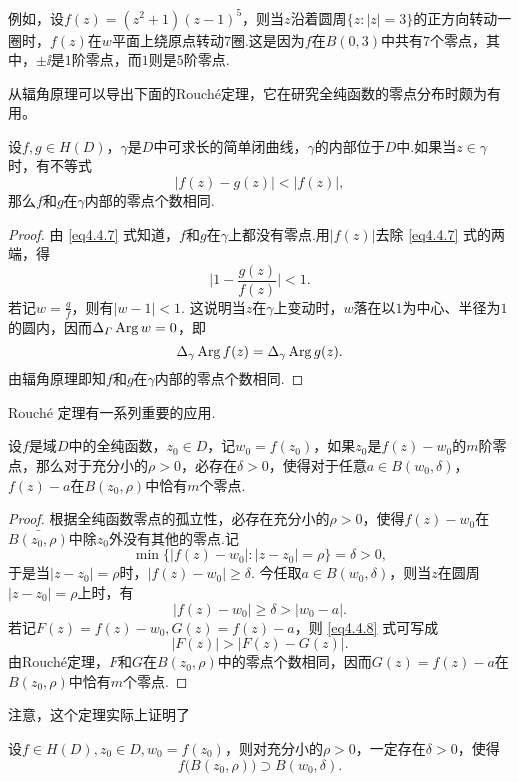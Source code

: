例如，设$f(z)=(z^2+1)(z-1)^5$，则当$z$沿着圆周$\{z:|z|=3\}$的正方向转动一圈时，$f(z)$在$w$平面上绕原点转动$7$圈.这是因为$f$在$B(0,3)$中共有$7$个零点，其中，$\pm\ii$是$1$阶零点，而$1$则是$5$阶零点.

从辐角原理可以导出下面的Rouch\'e定理，它在研究全纯函数的零点分布时颇为有用。
\begin{theorem}\label{thm4.4.3}
设$f,g\in H(D)$，$\gamma$是$D$中可求长的简单闭曲线，$\gamma$的内部位于$D$中.如果当$z\in\gamma$时，有不等式
\begin{equation}\label{eq4.4.7}
|f(z)-g(z)|<|f(z)|,
\end{equation}
那么$f$和$g$在$\gamma$内部的零点个数相同.
\end{theorem}
\begin{proof}
由 \eqref{eq4.4.7} 式知道，$f$和$g$在$\gamma$上都没有零点.用$|f(z)|$去除 \eqref{eq4.4.7} 式的两端，得
\[\bigg|1-\frac{g(z)}{f(z)}\bigg|<1.\]
若记$w=\frac gf$，则有$|w-1|<1$. 这说明当$z$在$\gamma$上变动时，$w$落在以$1$为中心、半径为$1$的圆内，因而$\Delta_\varGamma\operatorname{Arg} w=0$，即
\[\Delta_\gamma\operatorname{Arg} f(z)=\Delta_\gamma\operatorname{Arg} g(z).\]
由辐角原理即知$f$和$g$在$\gamma$内部的零点个数相同.
\end{proof}

Rouch\'e 定理有一系列重要的应用.
\begin{theorem}\label{thm4.4.4}
设$f$是域$D$中的全纯函数，$z_0\in D$，记$w_0=f(z_0)$，如果$z_0$是$f(z)-w_0$的$m$阶零点，那么对于充分小的$\rho>0$，必存在$\delta>0$，使得对于任意$a\in B(w_0,\delta)$，$f(z)-a$在$B(z_0,\rho)$中恰有$m$个零点.
\end{theorem}
\begin{proof}
根据全纯函数零点的孤立性，必存在充分小的$\rho>0$，使得$f(z)-w_0$在$\bar{B(z_0,\rho)}$中除$z_0$外没有其他的零点.记
\[\min\{|f(z)-w_0|:|z-z_0|=\rho\}=\delta>0,\]
于是当$|z-z_0|=\rho$时，$|f(z)-w_0|\ge\delta$. 今任取$a\in B(w_0,\delta)$，则当$z$在圆周$|z-z_0|=\rho$上时，有
\begin{equation}\label{eq4.4.8}
|f(z)-w_0|\ge\delta>|w_0-a|.
\end{equation}
若记$F(z)=f(z)-w_0,G(z)=f(z)-a$，则 \eqref{eq4.4.8} 式可写成
\[|F(z)|>|F(z)-G(z)|.\]
由Rouch\'e定理，$F$和$G$在$B(z_0,\rho)$中的零点个数相同，因而$G(z)=f(z)-a$在$B(z_0,\rho)$中恰有$m$个零点.
\end{proof}

注意，这个定理实际上证明了
\begin{corollary}\label{cor4.4.5}
设$f\in H(D),z_0\in D,w_0=f(z_0)$，则对充分小的$\rho>0$，一定存在$\delta>0$，使得
\[f\big(B(z_0,\rho)\big)\supset B(w_0,\delta).\]
\end{corollary}

